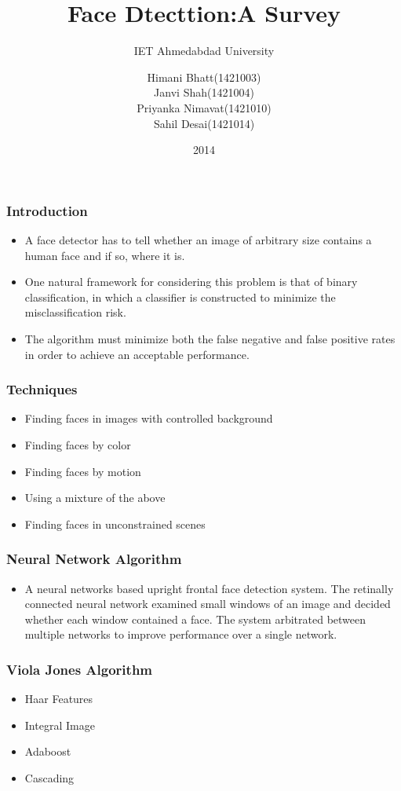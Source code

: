 \documentclass{beamer}
\title{Face Dtecttion:A Survey}
\subtitle{IET Ahmedabdad University}
\author{Himani Bhatt(1421003)\\ Janvi Shah(1421004)\\ Priyanka Nimavat(1421010)\\ Sahil Desai(1421014)}
\institute{Prof. Mehul Raval\\Prof. Ratnik Gandhi}
\date{2014}
\begin{document}
 
\frame{\titlepage}
 
\begin{frame}
\frametitle{Introduction}

\begin{itemize}
\item A face detector has to tell whether an image of arbitrary size contains a human face and if so, where it is.
\item One natural framework for considering this problem is that of binary classification, in which a classifier is constructed to minimize
the misclassification risk.
\item The algorithm must minimize both the false negative and false positive rates in order to achieve an acceptable performance.
\end{itemize}

\end{frame}

\begin{frame}
\frametitle{Techniques}

\begin{itemize}
\item Finding faces in images with controlled background
\item Finding faces by color
\item Finding faces by motion
\item Using a mixture of the above
\item Finding faces in unconstrained scenes
\end{itemize}
\end{frame}

\begin{frame}
\frametitle{Neural Network Algorithm}

\begin{itemize}
\item A neural networks based upright frontal face detection system. The retinally connected neural network examined small windows of an image and decided whether each window contained a face. The system arbitrated between multiple networks to improve performance over a single network.
\end{itemize}

\end{frame}

\begin{frame}
\frametitle{Viola Jones Algorithm}

\begin{itemize}
\item Haar Features
\item Integral Image
\item Adaboost
\item Cascading
\end{itemize}

\end{frame}
\end{document}
